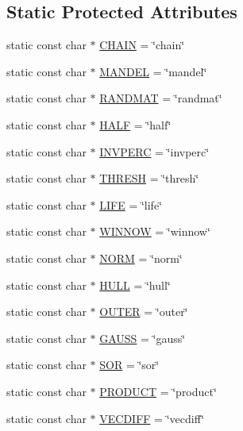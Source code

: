 \subsection*{Static Protected Attributes}
\begin{CompactItemize}
\item 
static const char $\ast$ \hyperlink{class_cowichan_17937f5dfe24c46c00a76d48ca70ccaa}{CHAIN} = \char`\"{}chain\char`\"{}
\item 
static const char $\ast$ \hyperlink{class_cowichan_40d3f57ec83c7c1ec3af94c37d849049}{MANDEL} = \char`\"{}mandel\char`\"{}
\item 
static const char $\ast$ \hyperlink{class_cowichan_c9e66484bf3be07bfeac5511f514f102}{RANDMAT} = \char`\"{}randmat\char`\"{}
\item 
static const char $\ast$ \hyperlink{class_cowichan_6ef0b7dddca7331c9bfb2acd0ea60088}{HALF} = \char`\"{}half\char`\"{}
\item 
static const char $\ast$ \hyperlink{class_cowichan_0665b5094fb551e4f000502ec752a4e8}{INVPERC} = \char`\"{}invperc\char`\"{}
\item 
static const char $\ast$ \hyperlink{class_cowichan_e7adc012eb484f209b869db5062dacd0}{THRESH} = \char`\"{}thresh\char`\"{}
\item 
static const char $\ast$ \hyperlink{class_cowichan_6d8355328c9a2e36321d3d33930f56b2}{LIFE} = \char`\"{}life\char`\"{}
\item 
static const char $\ast$ \hyperlink{class_cowichan_a4d4acfeeb50c0552487a59a58b3f962}{WINNOW} = \char`\"{}winnow\char`\"{}
\item 
static const char $\ast$ \hyperlink{class_cowichan_4e2cd818307d1e806861489216e74a0f}{NORM} = \char`\"{}norm\char`\"{}
\item 
static const char $\ast$ \hyperlink{class_cowichan_c0ca862afefd5d6ab8fefdbf47428b21}{HULL} = \char`\"{}hull\char`\"{}
\item 
static const char $\ast$ \hyperlink{class_cowichan_b858724b8531751af4f611b978998be4}{OUTER} = \char`\"{}outer\char`\"{}
\item 
static const char $\ast$ \hyperlink{class_cowichan_b51b18cab3bd7cab0f3eb5c10f4cce0a}{GAUSS} = \char`\"{}gauss\char`\"{}
\item 
static const char $\ast$ \hyperlink{class_cowichan_eaac49e2ebb0c5149506f0544cd87794}{SOR} = \char`\"{}sor\char`\"{}
\item 
static const char $\ast$ \hyperlink{class_cowichan_57a1deea813a95ad7ed5a46dd000e576}{PRODUCT} = \char`\"{}product\char`\"{}
\item 
static const char $\ast$ \hyperlink{class_cowichan_d70f851efe3d20a89d7bcf5e7db70344}{VECDIFF} = \char`\"{}vecdiff\char`\"{}
\end{CompactItemize}
